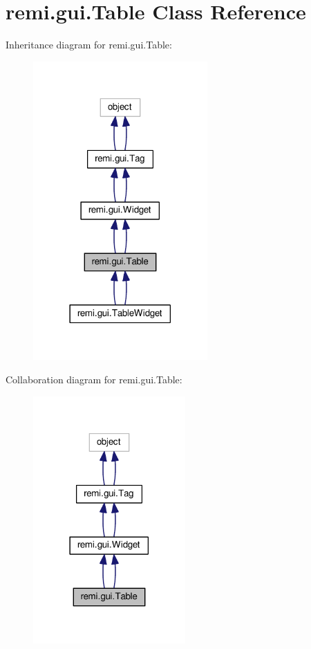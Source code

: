 \hypertarget{classremi_1_1gui_1_1Table}{}\section{remi.\+gui.\+Table Class Reference}
\label{classremi_1_1gui_1_1Table}


Inheritance diagram for remi.\+gui.\+Table\+:
\nopagebreak
\begin{figure}[H]
\begin{center}
\leavevmode
\includegraphics[width=189pt]{d9/d41/classremi_1_1gui_1_1Table__inherit__graph}
\end{center}
\end{figure}


Collaboration diagram for remi.\+gui.\+Table\+:
\nopagebreak
\begin{figure}[H]
\begin{center}
\leavevmode
\includegraphics[width=165pt]{d6/d5c/classremi_1_1gui_1_1Table__coll__graph}
\end{center}
\end{figure}
